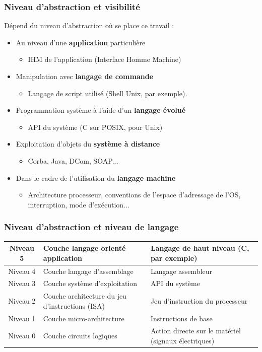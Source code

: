 \begin{frame}
 \frametitle{Niveau d'abstraction et visibilité}
Dépend du niveau d'abstraction où se place ce travail :
 \begin{itemize}
 \item<1> Au niveau d'une \textbf{application} particulière
 \begin{itemize}
 \item IHM de l'application (Interface Homme Machine)
 \end{itemize}
 \item<2> Manipulation avec \textbf{langage de commande}
 \begin{itemize}
 \item Langage de script utilisé (Shell Unix, par exemple).
 \end{itemize}
 \item<3> Programmation système à l'aide d'un \textbf{langage évolué}
 \begin{itemize}
 \item API du système (C sur POSIX, pour Unix)
 \end{itemize}
 \item<4> Exploitation d'objets du \textbf{système à distance}
 \begin{itemize}
 \item Corba, Java, DCom, SOAP...
 \end{itemize}
 \item<5> Dans le cadre de l'utilisation du \textbf{langage machine}
 \begin{itemize}
 \item Architecture processeur, conventions de l'espace d'adressage de l'OS, interruption, mode d'exécution...
 \end{itemize}
 \end{itemize}
\end{frame}

\begin{frame}
\frametitle{Niveau d'abstraction et niveau de langage}
\begin{tabular}{c|p{4.5cm}|p{4cm}}
Niveau 5 & Couche langage orienté application & Langage de haut niveau (C, par exemple) \\
\hline
Niveau 4 & Couche langage d'assemblage & Langage assembleur \\
\hline
Niveau 3 & Couche système d'exploitation & API du système \\
\hline
Niveau 2 & Couche architecture du jeu d'instructions (ISA) & Jeu d'instruction du processeur \\
\hline
Niveau 1 & Couche micro-architecture & Instructions de base \\
\hline
Niveau 0 & Couche circuits logiques & Action directe sur le matériel (signaux électriques)\\
\end{tabular}
\end{frame}


